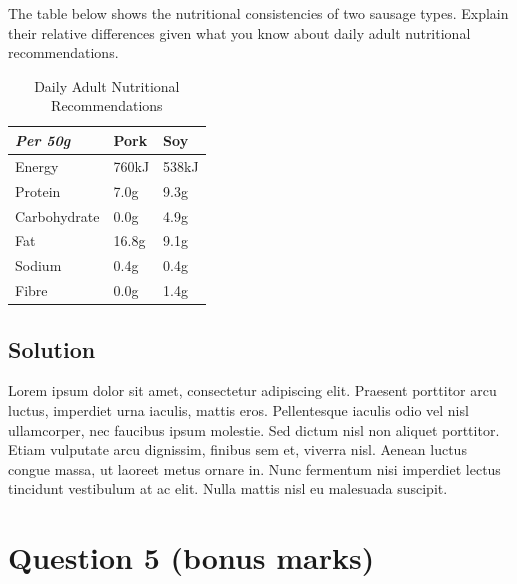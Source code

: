 \documentclass[
  UTF8, %
  12pt, %
]{assignment}
\begin{document}
\begin{problem}
The table below shows the nutritional consistencies of two sausage types. Explain their relative differences given what you know about daily adult nutritional recommendations.

\bigskip

\begin{table}[H]
  \centering
  \caption{Daily Adult Nutritional Recommendations}
  \label{tab:nutritional_recommendations}
  \begin{tabular}{|l|l|l|}
    \toprule
    \textit{Per 50g} & Pork  & Soy   \\
    \midrule
    Energy           & 760kJ & 538kJ \\
    Protein          & 7.0g  & 9.3g  \\
    Carbohydrate     & 0.0g  & 4.9g  \\
    Fat              & 16.8g & 9.1g  \\
    Sodium           & 0.4g  & 0.4g  \\
    Fibre            & 0.0g  & 1.4g  \\
    \bottomrule
  \end{tabular}
\end{table}

\medskip
\end{problem}


\subsection*{Solution}

Lorem ipsum dolor sit amet, consectetur adipiscing elit. Praesent porttitor arcu luctus, imperdiet urna iaculis, mattis eros. Pellentesque iaculis odio vel nisl ullamcorper, nec faucibus ipsum molestie. Sed dictum nisl non aliquet porttitor. Etiam vulputate arcu dignissim, finibus sem et, viverra nisl. Aenean luctus congue massa, ut laoreet metus ornare in. Nunc fermentum nisi imperdiet lectus tincidunt vestibulum at ac elit. Nulla mattis nisl eu malesuada suscipit.


\section*{Question 5 (bonus marks)}
\end{document}
